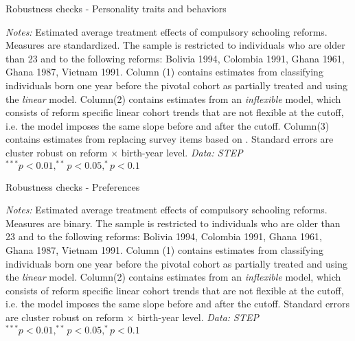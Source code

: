 \begin{table}[htbp]
	\caption{Robustness checks - Personality traits and behaviors}
	\label{tab:robust_ncogn}
	\centering
	\begin{threeparttable}
		\footnotesize
		
		\begin{tablenotes}
			\footnotesize
			\item \textit{Notes:} Estimated average treatment effects of compulsory schooling reforms. Measures are standardized. The sample is restricted to individuals who are older than 23 and to the following reforms: Bolivia 1994, Colombia 1991, Ghana 1961, Ghana 1987, Vietnam 1991. Column (1) contains estimates from classifying individuals born one year before the pivotal cohort as partially treated and using the \textit{linear} model. Column(2) contains estimates from an \textit{inflexible} model, which consists of reform specific linear cohort trends that are not flexible at the cutoff, i.e. the model imposes the same slope before and after the cutoff. Column(3) contains estimates from replacing survey items based on \citet{laajaj_challenges_2019}. Standard errors are cluster robust on reform $\times$ birth-year level. \textit{Data: STEP} $^{***} p < 0.01, ^{**} p < 0.05, ^{*} p < 0.1$
		\end{tablenotes}
	\end{threeparttable}
\end{table}

\begin{table}[htbp]
	\caption{Robustness checks - Preferences}
	\label{tab:robust_prefs}
	\centering
	\begin{threeparttable}
		\footnotesize
		
		\begin{tablenotes}
			\footnotesize
			\item \textit{Notes:} Estimated average treatment effects of compulsory schooling reforms. Measures are binary. The sample is restricted to individuals who are older than 23 and to the following reforms: Bolivia 1994, Colombia 1991, Ghana 1961, Ghana 1987, Vietnam 1991. Column (1) contains estimates from classifying individuals born one year before the pivotal cohort as partially treated and using the \textit{linear} model. Column(2) contains estimates from an \textit{inflexible} model, which consists of reform specific linear cohort trends that are not flexible at the cutoff, i.e. the model imposes the same slope before and after the cutoff. Standard errors are cluster robust on reform $\times$ birth-year level. \textit{Data: STEP} $^{***} p < 0.01, ^{**} p < 0.05, ^{*} p < 0.1$
		\end{tablenotes}
	\end{threeparttable}
\end{table}



